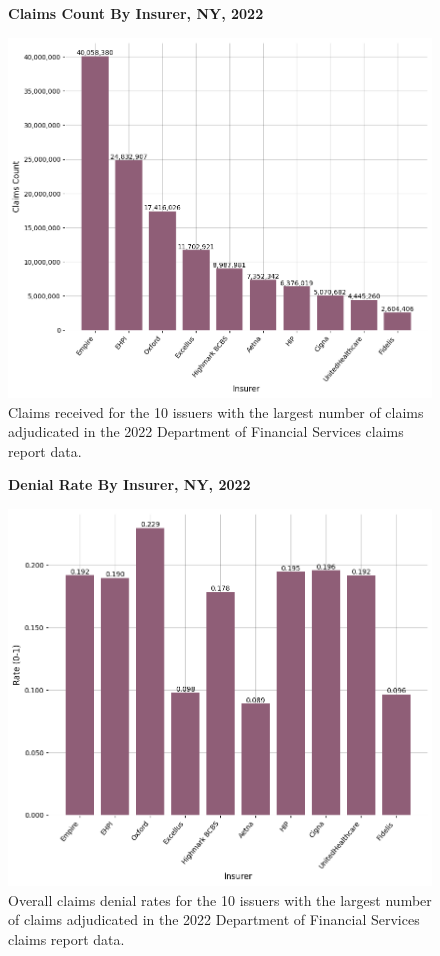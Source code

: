 \documentclass[12pt, a4paper,twoside]{report}
\theoremstyle{plain} %
\theoremstyle{definition} %
\theoremstyle{remark} %
\numberwithin{equation}{chapter}
\begin{document}
		\begin{figure}[h!]
			\centering
			\textbf{Claims Count By Insurer, NY, 2022}\par\medskip
			\includegraphics[width=\columnwidth]{images/ny_claim_reports/claims_by_insurer.png}
			\caption{Claims received for the 10 issuers with the largest number of claims adjudicated in the 2022 Department of Financial Services claims report data.}
			\label{nyinsurerclaims}
		\end{figure}
		
		\clearpage
		
		
		\begin{figure}[h!]
			\centering
			\textbf{Denial Rate By Insurer, NY, 2022}\par\medskip
			\includegraphics[width=\columnwidth]{images/ny_claim_reports/denial_rate_by_insurer.png}
			\caption{Overall claims denial rates for the 10 issuers with the largest number of claims adjudicated in the 2022 Department of Financial Services claims report data.}
			\label{nyinsurerdenialrates}
		\end{figure}
		
\end{document}
